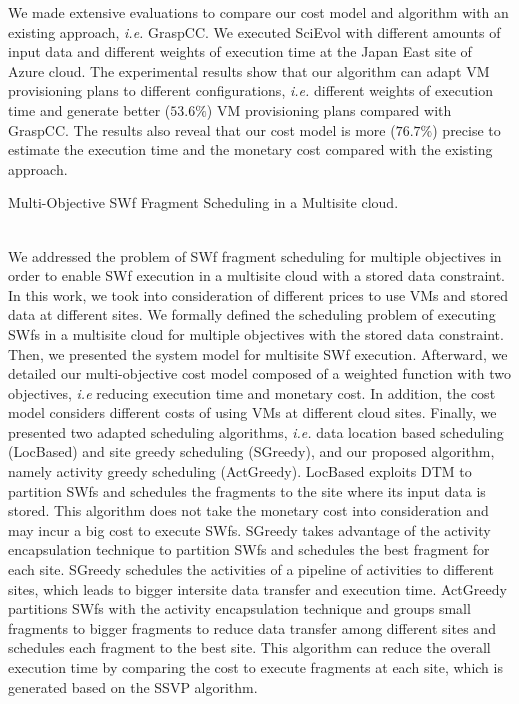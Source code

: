 We made extensive evaluations to compare our cost model and algorithm with an existing approach, \textit{i.e.} GraspCC. We executed SciEvol with different amounts of input data and different weights of execution time at the Japan East site of Azure cloud. The experimental results show that our algorithm can adapt VM provisioning plans to different configurations, \textit{i.e.} different weights of execution time and generate better ($53.6\%$) VM provisioning plans compared with GraspCC. The results also reveal that our cost model is more ($76.7\%$) precise to estimate the execution time and the monetary cost compared with the existing approach.
\\[12pt]
\noindent \begin{bf}Multi-Objective SWf Fragment Scheduling in a Multisite cloud.\end{bf} 
\\[6pt]
\noindent We addressed the problem of SWf fragment scheduling for multiple objectives in order to enable SWf execution in a multisite cloud with a stored data constraint. In this work, we took into consideration of different prices to use VMs and stored data at different sites.
We formally defined the scheduling problem of executing SWfs in a multisite cloud for multiple objectives with the stored data constraint. Then, we presented the system model for multisite SWf execution. Afterward, we detailed our multi-objective cost model composed of a weighted function with two objectives, \textit{i.e} reducing execution time and monetary cost. In addition, the cost model considers different costs of using VMs at different cloud sites. Finally, we presented two adapted scheduling algorithms, \textit{i.e.} data location based scheduling (LocBased) and site greedy scheduling (SGreedy), and our proposed algorithm, namely activity greedy scheduling (ActGreedy). LocBased exploits DTM to partition SWfs and schedules the fragments to the site where its input data is stored. This algorithm does not take the monetary cost into consideration and may incur a big cost to execute SWfs. SGreedy takes advantage of the activity encapsulation technique to partition SWfs and schedules the best fragment for each site. SGreedy schedules the activities of a pipeline of activities to different sites, which leads to bigger intersite data transfer and execution time. ActGreedy partitions SWfs with the activity encapsulation technique and groups small fragments to bigger fragments to reduce data transfer among different sites and schedules each fragment to the best site. This algorithm can reduce the overall execution time by comparing the cost to execute fragments at each site, which is generated based on the SSVP algorithm. 

